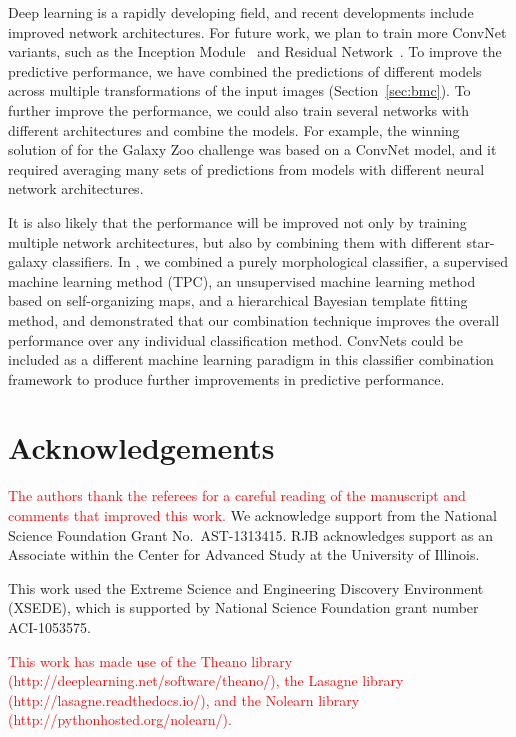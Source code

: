 \documentclass[fleqn,usenatbib]{mnras}
\newcommand{\changed}[1]{\textcolor{red}{#1}}
\begin{document}
Deep learning is a rapidly developing field, and recent developments include
improved network architectures.
For future work, we plan to train more ConvNet variants, such as the
Inception Module~\citep{szegedy2015going} and Residual Network~\citep{he2015deep}.
To improve the predictive performance,
we have combined the predictions of different models across multiple
transformations of the input images (Section~\ref{sec:bmc}).
To further improve the performance, we could also train several networks
with different architectures and combine the models.
For example, the winning solution of \cite{dieleman2015rotation}
for the Galaxy Zoo challenge was based on a ConvNet model,
and it required averaging many sets of predictions from models with different
neural network architectures.

It is also likely that the performance will be improved
not only by training multiple network architectures,
but also by combining them with different star-galaxy classifiers.
In \citet{kim2015hybrid}, we combined a purely morphological classifier,
a supervised machine learning method (TPC),
an unsupervised machine learning method based on self-organizing maps,
and a hierarchical Bayesian template fitting method, and
demonstrated that our combination technique improves the overall
performance over any individual classification method.
ConvNets could be included as a different machine learning paradigm in this
classifier combination framework to produce further improvements in
predictive performance.



\section*{Acknowledgements}

\changed{
The authors thank the referees for a careful reading of the manuscript
and comments that improved this work.
}
We acknowledge support from the 
National Science Foundation Grant No.\ AST-1313415.
RJB acknowledges support as an Associate
within the Center for Advanced Study at the University of Illinois.

This work used the Extreme Science and Engineering Discovery Environment
(XSEDE), which is supported by National Science Foundation grant number
ACI-1053575.

\changed{
This work has made use of the Theano library (http://deeplearning.net/software/theano/),
the Lasagne library (http://lasagne.readthedocs.io/),
and the Nolearn library (http://pythonhosted.org/nolearn/).
}
\end{document}
